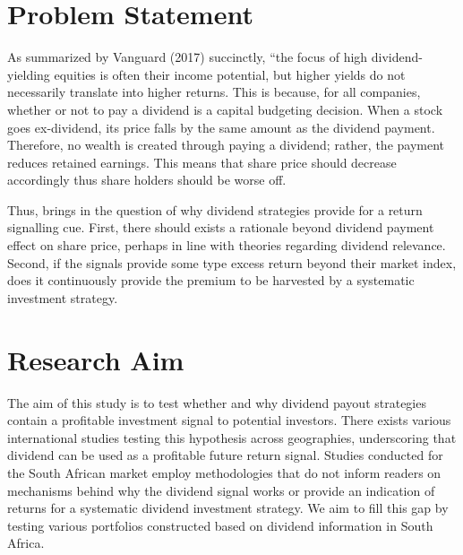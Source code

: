 \documentclass[12pt,preprint, authoryear]{elsarticle}
\numberwithin{equation}{section}
\numberwithin{figure}{section}
\numberwithin{table}{section}
\begin{document}

\headsep 35pt %




\hypertarget{problem-statement}{%
\section{Problem Statement}\label{problem-statement}}

As summarized by Vanguard (2017) succinctly, ``the focus of high
dividend-yielding equities is often their income potential, but higher
yields do not necessarily translate into higher returns. This is
because, for all companies, whether or not to pay a dividend is a
capital budgeting decision. When a stock goes ex-dividend, its price
falls by the same amount as the dividend payment. Therefore, no wealth
is created through paying a dividend; rather, the payment reduces
retained earnings. This means that share price should decrease
accordingly thus share holders should be worse off.

Thus, brings in the question of why dividend strategies provide for a
return signalling cue. First, there should exists a rationale beyond
dividend payment effect on share price, perhaps in line with theories
regarding dividend relevance. Second, if the signals provide some type
excess return beyond their market index, does it continuously provide
the premium to be harvested by a systematic investment strategy.

\hypertarget{research-aim}{%
\section{Research Aim}\label{research-aim}}

The aim of this study is to test whether and why dividend payout
strategies contain a profitable investment signal to potential
investors. There exists various international studies testing this
hypothesis across geographies, underscoring that dividend can be used as
a profitable future return signal. Studies conducted for the South
African market employ methodologies that do not inform readers on
mechanisms behind why the dividend signal works or provide an indication
of returns for a systematic dividend investment strategy. We aim to fill
this gap by testing various portfolios constructed based on dividend
information in South Africa.
\end{document}
